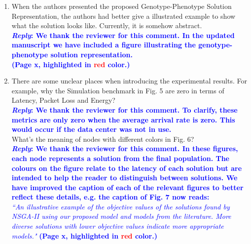 \begin{enumerate}
      \item\textsf{When the authors presented the proposed Genotype-Phenotype Solution Representation, the authors had better give a illustrated example to show what the solution looks like. Currently, it is somehow abstract.}\\
            \textcolor{blue}{\textbf{\textit{Reply}: We thank the reviewer for this comment. In the updated manuscript we have included a figure illustrating the genotype-phenotype solution representation.}}\\
            \textcolor{blue}{\textbf{(Page x, highlighted in \textcolor{red}{red} color.)}}

      \item\textsf{There are some unclear places when introducing the experimental results. For example, why the Simulation benchmark in Fig. 5 are zero in terms of Latency, Packet Loss and Energy?}\\
            \textcolor{blue}{\textbf{\textit{Reply}: We thank the reviewer for this comment. To clarify, these metrics are only zero when the average arrival rate is zero. This would occur if the data center was not in use.}}\\

            \textsf{What’s the meaning of nodes with different colors in Fig. 6?}\\
            \textcolor{blue}{\textbf{\textit{Reply}: We thank the reviewer for this comment. In these figures, each node represents a solution from the final population. The colours on the figure relate to the latency of each solution but are intended to help the reader to distinguish between solutions. We have improved the caption of each of the relevant figures to better reflect these details, e.g. the caption of Fig. 7 now reads:}}\\
            \textcolor{blue}{\textit{``An illustrative example of the objective values of the solutions found by NSGA-II using our proposed model and
            models from the literature. More diverse solutions with lower objective values indicate more appropriate models."} \textbf{(Page x, highlighted in \textcolor{red}{red} color.)}}

\end{enumerate}

\clearpage
